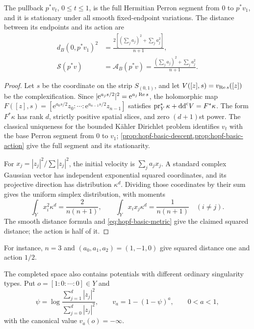 \begin{proposition}\label{prop:hopf-diagonal-geodesic}
The pullback $p^*v_t$, $0\leq t\leq1$, is the full Hermitian Perron segment from $0$ to $p^*v_1$, and it is stationary under all smooth fixed-endpoint variations. The distance between its endpoints and its action are
\[
 \begin{aligned}
 d_B(0,p^*v_1)^2&=\frac{2[(\sum_ja_j)^2+\sum_ja_j^2]}{n+1},\\
 \mathscr S(p^*v)&=\mathcal A_B(p^*v)
 =\frac{(\sum_ja_j)^2+\sum_ja_j^2}{n+1}.
 \end{aligned}
\]
\end{proposition}
\begin{proof}
Let $s$ be the coordinate on the strip $S_{(0,1)}$, and let $V([z],s)=v_{\operatorname{Re} s}([z])$ be the complexification. Since $|\mathrm e^{a_js/2}|^2=\mathrm e^{a_j\operatorname{Re} s}$, the holomorphic map
$F([z],s)=[\mathrm e^{a_0s/2}z_0:\cdots:\mathrm e^{a_{n-1}s/2}z_{n-1}]$
satisfies $\operatorname{pr}_Y^*\kappa+\mathrm{dd}^{\mathrm{c}} V=F^*\kappa$. The form $F^*\kappa$ has rank $d$, strictly positive spatial slices, and zero $(d+1)$st power. The classical uniqueness for the bounded K\"ahler Dirichlet problem identifies $v_t$ with the base Perron segment from $0$ to $v_1$; \cref{prop:hopf-basic-descent,prop:hopf-basic-action} give the full segment and its stationarity.

For $x_j=|z_j|^2/\sum|z_j|^2$, the initial velocity is $\sum_ja_jx_j$. A standard complex Gaussian vector has independent exponential squared coordinates, and its projective direction has distribution $\kappa^d$. Dividing those coordinates by their sum gives the uniform simplex distribution, with moments
\[
 \int_Yx_i^2\kappa^d=\frac2{n(n+1)},
 \qquad \int_Yx_ix_j\kappa^d=\frac1{n(n+1)}\quad(i\ne j).
\]
The smooth distance formula and \eqref{eq:hopf-basic-metric} give the claimed squared distance; the action is half of it.
\end{proof}

For instance, $n=3$ and $(a_0,a_1,a_2)=(1,-1,0)$ give squared distance one and action $1/2$.

The completed space also contains potentials with different ordinary singularity types. Put $o=[1:0:\cdots:0]\in Y$ and
\[
 \psi=\log\frac{\sum_{j=1}^d|z_j|^2}{\sum_{j=0}^d|z_j|^2},
 \qquad v_a=1-(1-\psi)^a,\qquad0<a<1,
\]
with the canonical value $v_a(o)=-\infty$.

